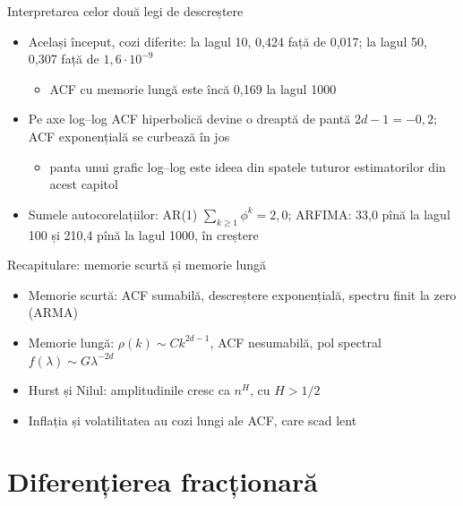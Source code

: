 \begin{frame}{Interpretarea celor două legi de descreștere}
\itemsize{\small}
\begin{itemize}
    \item Același început, cozi diferite: la lagul 10, 0{,}424 față de 0{,}017; la lagul 50, 0{,}307 față de $1{,}6 \cdot 10^{-9}$
    \begin{itemize}
        \item ACF cu memorie lungă este încă 0{,}169 la lagul 1000
    \end{itemize}
    \item Pe axe log--log ACF hiperbolică devine o dreaptă de pantă $2d - 1 = -0{,}2$; ACF exponențială se curbează în jos
    \begin{itemize}
        \item panta unui grafic log--log este ideea din spatele tuturor estimatorilor din acest capitol
    \end{itemize}
    \item Sumele autocorelațiilor: AR(1) $\sum_{k\ge1}\phi^k = 2{,}0$; ARFIMA: 33{,}0 pînă la lagul 100 și 210{,}4 pînă la lagul 1000, în creștere
\end{itemize}
\end{frame}

\begin{frame}{Recapitulare: memorie scurtă și memorie lungă}
\itemsize{\small}
\begin{itemize}
    \item Memorie scurtă: ACF sumabilă, descreștere exponențială, spectru finit la zero (ARMA)
    \item Memorie lungă: $\rho(k) \sim Ck^{2d-1}$, ACF nesumabilă, pol spectral $f(\lambda) \sim G\lambda^{-2d}$
    \item Hurst și Nilul: amplitudinile cresc ca $n^H$, cu $H > 1/2$
    \item Inflația și volatilitatea au cozi lungi ale ACF, care scad lent
\end{itemize}
\end{frame}


\section{Diferențierea fracționară}

